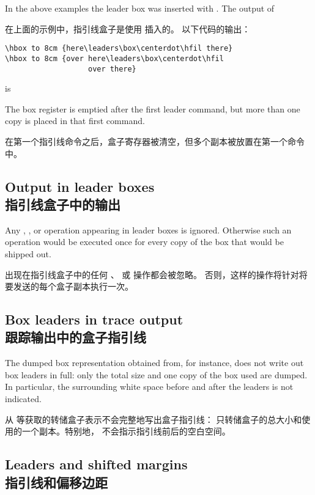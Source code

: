 In the above examples the leader box was inserted with
. The output of

在上面的示例中，指引线盒子是使用  插入的。
以下代码的输出：
\begin{verbatim}
\hbox to 8cm {here\leaders\box\centerdot\hfil there}
\hbox to 8cm {over here\leaders\box\centerdot\hfil 
                   over there}
\end{verbatim}
is
\begin{disp}\leavevmode
     \end{disp}
The box register is emptied after the first leader command,
but more than one copy is placed in that first command.

在第一个指引线命令之后，盒子寄存器被清空，但多个副本被放置在第一个命令中。
\subsection{Output in leader boxes\\指引线盒子中的输出}

Any , , or  operation
appearing in leader boxes is ignored. 
Otherwise such an operation would be executed once for every
copy of the box that would be shipped out.

出现在指引线盒子中的任何 、 或  操作都会被忽略。
否则，这样的操作将针对将要发送的每个盒子副本执行一次。

\subsection{Box leaders in trace output\\跟踪输出中的盒子指引线}

The dumped box representation obtained from,
for instance, 
does not write out box leaders in full: only the total size and
one copy of the box used are dumped. In particular,
the surrounding white space before and after the leaders
is not indicated.

从  等获取的转储盒子表示不会完整地写出盒子指引线：
只转储盒子的总大小和使用的一个副本。特别地，
不会指示指引线前后的空白空间。

\subsection{Leaders and shifted margins\\指引线和偏移边距}

